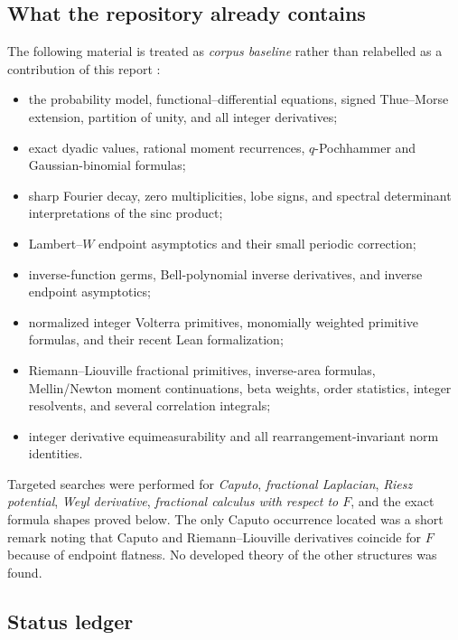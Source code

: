 \documentclass[11pt,oneside]{article}
\numberwithin{equation}{section}
\theoremstyle{plain}
\theoremstyle{definition}
\theoremstyle{remark}
\begin{document}
\subsection{What the repository already contains}

The following material is treated as \emph{corpus baseline} rather than
relabelled as a contribution of this report
\cite{ProveItPrimary,ProveItAntiderivatives,ProveItFourier}:
\begin{itemize}
\item the probability model, functional--differential equations, signed
      Thue--Morse extension, partition of unity, and all integer derivatives;
\item exact dyadic values, rational moment recurrences, $q$-Pochhammer and
      Gaussian-binomial formulas;
\item sharp Fourier decay, zero multiplicities, lobe signs, and spectral
      determinant interpretations of the sinc product;
\item Lambert--$W$ endpoint asymptotics and their small periodic correction;
\item inverse-function germs, Bell-polynomial inverse derivatives, and inverse
      endpoint asymptotics;
\item normalized integer Volterra primitives, monomially weighted primitive
      formulas, and their recent Lean formalization;
\item Riemann--Liouville fractional primitives, inverse-area formulas,
      Mellin/Newton moment continuations, beta weights, order statistics,
      integer resolvents, and several correlation integrals;
\item integer derivative equimeasurability and all rearrangement-invariant
      norm identities.
\end{itemize}

Targeted searches were performed for \emph{Caputo}, \emph{fractional
Laplacian}, \emph{Riesz potential}, \emph{Weyl derivative},
\emph{fractional calculus with respect to $F$}, and the exact formula shapes
proved below.  The only Caputo occurrence located was a short remark noting
that Caputo and Riemann--Liouville derivatives coincide for $F$ because of
endpoint flatness.  No developed theory of the other structures was found.

\subsection{Status ledger}
\end{document}
